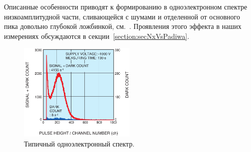 Описанные особенности приводят к формированию в одноэлектронном спектре низкоамплитудной части, сливающейся с шумами и отделенной от основного пика довольно глубокой ложбинкой, см.~. Проявления этого эффекта в наших измерениях обсуждаются в секции~\ref{section:secNxVsPadiwa}.

\begin{figure}
\includegraphics[width=0.5\textwidth]{pictures/3_Typical_spectrum_from_H12700.png}
\caption{Типичный одноэлектронный спектр.}
\label{fig:SPEspectrum}
\end{figure}
